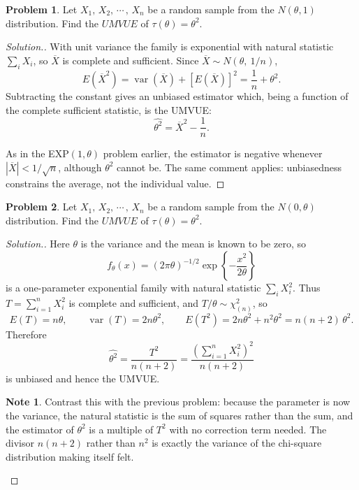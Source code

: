 \documentclass[12pt,a4paper]{report}
\theoremstyle{definition}
\newtheorem*{note}{Note}
\DeclareMathOperator{\var}{var}
\newtheorem{problemx}{Problem}[section]
\newenvironment{problem}{\begin{problemx}}{\end{problemx}}
\newenvironment{solution}
  {\renewcommand{\qedsymbol}{}\begin{proof}[\textit{Solution}.]}
  {\end{proof}}
\begin{document}
\begin{problem}
Let $X_1, \, X_2, \, \cdots\, , \, X_n$ be a random sample from the $N(\theta, 1)$ distribution. Find the $UMVUE$ of $\tau(\theta) = \theta^2$.
\end{problem}

\begin{solution}
With unit variance the family is exponential with natural statistic
$\sum_i X_i$, so $\overline{X}$ is complete and sufficient. Since
$\overline{X}\sim N\left(\theta,\ 1/n\right)$,
\[E\left(\overline{X}^{2}\right) = \var\left(\overline{X}\right) + \left[E\left(\overline{X}\right)\right]^{2}
= \frac{1}{n} + \theta^{2}.\]
Subtracting the constant gives an unbiased estimator which, being a function of
the complete sufficient statistic, is the UMVUE:
\[\widehat{\theta^{2}} = \overline{X}^{2} - \frac{1}{n}.\]

As in the EXP$(1,\theta)$ problem earlier, the estimator is negative whenever
$\left|\overline{X}\right| < 1/\sqrt{n}$, although $\theta^{2}$ cannot be. The
same comment applies: unbiasedness constrains the average, not the individual
value.
\end{solution}

\begin{problem}
Let $X_1, \, X_2, \, \cdots\, , \, X_n$ be a random sample from the $N(0, \theta)$ distribution. Find the $UMVUE$ of $\tau (\theta) = \theta^2$.
\end{problem}

\begin{solution}
Here $\theta$ is the variance and the mean is known to be zero, so
\[f_{\theta}(x) = \left(2\pi\theta\right)^{-1/2}\exp\left\{-\frac{x^{2}}{2\theta}\right\}\]
is a one-parameter exponential family with natural statistic $\sum_i X_i^{2}$.
Thus $T=\sum_{i=1}^{n}X_i^{2}$ is complete and sufficient, and $T/\theta\sim\chi^{2}_{(n)}$,
so
\[E(T) = n\theta,\qquad \var(T) = 2n\theta^{2},\qquad
E\left(T^{2}\right) = 2n\theta^{2} + n^{2}\theta^{2} = n(n+2)\,\theta^{2}.\]
Therefore
\[\widehat{\theta^{2}} = \frac{T^{2}}{n(n+2)}
= \frac{\left(\sum_{i=1}^{n}X_i^{2}\right)^{2}}{n(n+2)}\]
is unbiased and hence the UMVUE.

\begin{note}
Contrast this with the previous problem: because the parameter is now the
variance, the natural statistic is the sum of squares rather than the sum, and
the estimator of $\theta^{2}$ is a multiple of $T^{2}$ with no correction term
needed. The divisor $n(n+2)$ rather than $n^{2}$ is exactly the variance of the
chi-square distribution making itself felt.
\end{note}
\end{solution}
\end{document}
